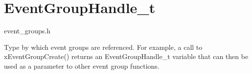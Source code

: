 \hypertarget{group__EventGroupHandle__t}{}\section{Event\+Group\+Handle\+\_\+t}
\label{group__EventGroupHandle__t}
event\+\_\+groups.\+h

Type by which event groups are referenced. For example, a call to x\+Event\+Group\+Create() returns an Event\+Group\+Handle\+\_\+t variable that can then be used as a parameter to other event group functions. 